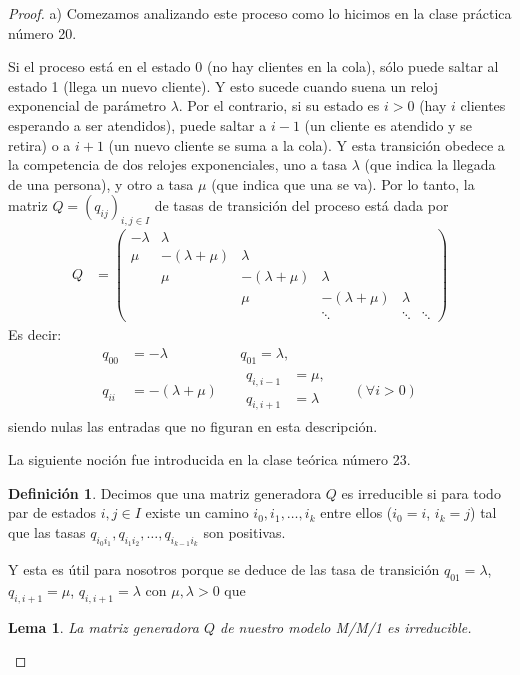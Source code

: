 \documentclass{article}
\newtheorem{lemma}{Lema}
\theoremstyle{definition}
\newtheorem{definition}{Definición}
\begin{document}
\begin{proof} a)
Comezamos analizando este proceso como lo hicimos en la clase práctica número 20.

Si el proceso está en el estado 0 (no hay clientes en la cola), sólo puede saltar al estado 1 (llega un nuevo cliente). 
Y esto sucede cuando suena un reloj exponencial de parámetro \(\lambda\).
Por el contrario, si su estado es \(i > 0\) (hay \(i\) clientes esperando a ser atendidos), puede saltar a \(i - 1\) (un cliente es atendido y se retira) o a \(i + 1\) (un nuevo cliente se suma a la cola).
Y esta transición obedece a la competencia de dos relojes exponenciales, uno a tasa \(\lambda\) (que indica la llegada de una persona), y otro a tasa \(\mu\) (que indica que una se va).
Por lo tanto, la matriz \(Q = (q_{i j})_{i, j \in I}\) de tasas de transición del proceso está dada por
\begin{align}
	Q
	&=
	\begin{pmatrix}
		- \lambda &\lambda \\
		\mu &- (\lambda + \mu) &\lambda \\
		 &\mu &- (\lambda + \mu) &\lambda \\
		 & &\mu &- (\lambda + \mu) &\lambda \\
		 & & &\ddots &\ddots &\ddots
	\end{pmatrix}
\end{align}
Es decir:
\begin{align}
	q_{0 0} &= - \lambda & &q_{0 1} = \lambda,
	\\
	q_{i i} &= - (\lambda + \mu) & &\begin{aligned}q_{i, i-1} &= \mu,\\ q_{i, i+1} &= \lambda \end{aligned} &&(\forall i > 0)
\end{align}
siendo nulas las entradas que no figuran en esta descripción.

La siguiente noción fue introducida en la clase teórica número 23.
\begin{definition}
Decimos que una matriz generadora \(Q\) es irreducible si para todo par de estados \(i, j \in I\) existe un camino \(i_0, i_1, \dots, i_k\) entre ellos (\(i_0 = i\), \(i_k = j\)) tal que las tasas \(q_{i_0 i_1}, q_{i_1 i_2}, \dots, q_{i_{k - 1} i_k}\) son positivas.
\end{definition}
Y esta es útil para nosotros porque se deduce de las tasa de transición \(q_{01} = \lambda\), \(q_{i, i + 1} = \mu\), \(q_{i, i + 1} = \lambda\) con \(\mu, \lambda > 0\) que
\begin{lemma}
La matriz generadora \(Q\) de nuestro modelo M/M/1 es irreducible.
\end{lemma}


\end{proof}
\end{document}
